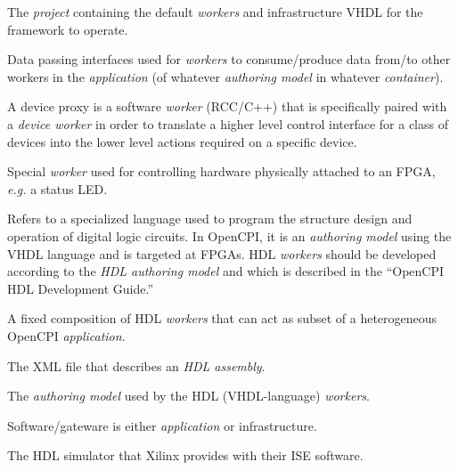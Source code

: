 \begin{description}[style=nextline]
\item[Core]
The \textit{project} containing the default \textit{workers} and infrastructure VHDL for the framework to operate.

\item[Data Plane]
Data passing interfaces used for \textit{workers} to consume/produce data from/to other workers in the \textit{application} (of whatever \textit{authoring model} in whatever \textit{container}).

\item[Device Proxy]
A device proxy is a software \textit{worker} (RCC/C++) that is specifically paired with a \textit{device worker} in order to translate a higher level control interface for a class of devices into the lower level actions required on a specific device.

\item[Device Worker]
Special \textit{worker} used for controlling hardware physically attached to an FPGA, \textit{e.g.} a status LED.

\item[Hardware Description Language]
Refers to a specialized language used to program the structure design and operation of digital logic circuits. In OpenCPI, it is an \textit{authoring model} using the VHDL language and is targeted at FPGAs. HDL \textit{workers} should be developed according to the \textit{HDL authoring model} and which is described in the ``OpenCPI HDL Development Guide.''

\item[HDL Assembly]
A fixed composition of HDL \textit{workers} that can act as subset of a heterogeneous OpenCPI \textit{application}.

\item[HDL Assembly Description (OHAD)]
The XML file that describes an \textit{HDL assembly}.

\item[HDL Authoring Model]
The \textit{authoring model} used by the HDL (VHDL-language) \textit{workers}.

\item[Infrastructure]
Software/gateware is either \textit{application} or infrastructure.

\item[isim]
The HDL simulator that Xilinx provides with their ISE software.



\end{description}

